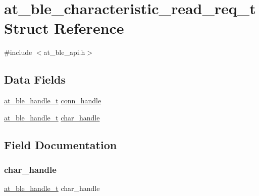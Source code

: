 \hypertarget{structat__ble__characteristic__read__req__t}{}\section{at\+\_\+ble\+\_\+characteristic\+\_\+read\+\_\+req\+\_\+t Struct Reference}
\label{structat__ble__characteristic__read__req__t}


{\ttfamily \#include $<$at\+\_\+ble\+\_\+api.\+h$>$}

\subsection*{Data Fields}
\begin{DoxyCompactItemize}
\item 
\mbox{\hyperlink{at__ble__api_8h_abd23646d0c662860741f787efc8456f2}{at\+\_\+ble\+\_\+handle\+\_\+t}} \mbox{\hyperlink{structat__ble__characteristic__read__req__t_ae42df6fd8493f8f8faeccfdd6062e96f}{conn\+\_\+handle}}
\item 
\mbox{\hyperlink{at__ble__api_8h_abd23646d0c662860741f787efc8456f2}{at\+\_\+ble\+\_\+handle\+\_\+t}} \mbox{\hyperlink{structat__ble__characteristic__read__req__t_abf2dd98b1df5d9471f3e18780eb5e5a7}{char\+\_\+handle}}
\end{DoxyCompactItemize}


\subsection{Field Documentation}
\mbox{\label{structat__ble__characteristic__read__req__t_abf2dd98b1df5d9471f3e18780eb5e5a7}} 
\subsubsection{\texorpdfstring{char\_handle}{char\_handle}}
{\footnotesize\ttfamily \mbox{\hyperlink{at__ble__api_8h_abd23646d0c662860741f787efc8456f2}{at\+\_\+ble\+\_\+handle\+\_\+t}} char\+\_\+handle}

\mbox{\label{structat__ble__characteristic__read__req__t_ae42df6fd8493f8f8faeccfdd6062e96f}} 

